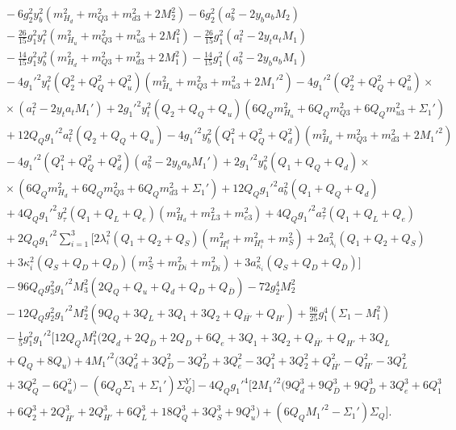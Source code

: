 \documentclass[preprint,amsmath,amssymb,aps,superscriptaddress,prd,showpacs,floatfix,nofootinbib]{revtex4-1}
\begin{document}
\begin{subequations}
\begin{align}
&{}-6g_2^2y_b^2\left ( m_{H_d}^2+m_{Q3}^2+m_{d3}^2+2M_2^2\right )-6g_2^2\left ( a_b^2-2y_ba_bM_2\right )\nonumber\\
&{}-\frac{26}{15}g_1^2y_t^2\left ( m_{H_u}^2+m_{Q3}^2+m_{u3}^2+2M_1^2\right )-\frac{26}{15}g_1^2\left ( a_t^2-2y_ta_tM_1\right )\nonumber\\
&{}-\frac{14}{15}g_1^2y_b^2\left ( m_{H_d}^2+m_{Q3}^2+m_{d3}^2+2M_1^2\right )-\frac{14}{15}g_1^2\left ( a_b^2-2y_ba_bM_1\right )\nonumber\\
&{}-4g_1'^2y_t^2\left ( Q_2^2+Q_Q^2+Q_u^2\right )\left ( m_{H_u}^2+m_{Q3}^2+m_{u3}^2+2M_1'^2\right )-4g_1'^2\left ( Q_2^2+Q_Q^2+Q_u^2\right )\times\nonumber\\
&{}\times\left ( a_t^2-2y_ta_tM_1'\right )+2g_1'^2y_t^2\left ( Q_2+Q_Q+Q_u\right )\left ( 6Q_Qm_{H_u}^2+6Q_Qm_{Q3}^2+6Q_Qm_{u3}^2+\Sigma_1'\right )\nonumber\\
&{}+12Q_Qg_1'^2a_t^2\left ( Q_2+Q_Q+Q_u\right )-4g_1'^2y_b^2\left ( Q_1^2+Q_Q^2+Q_d^2\right )\left ( m_{H_d}^2+m_{Q3}^2+m_{d3}^2+2M_1'^2\right )\nonumber\\
&{}-4g_1'^2\left ( Q_1^2+Q_Q^2+Q_d^2\right )\left ( a_b^2-2y_ba_bM_1'\right )+2g_1'^2y_b^2\left ( Q_1+Q_Q+Q_d\right )\times\nonumber\\
&{}\times\left ( 6Q_Qm_{H_d}^2+6Q_Qm_{Q3}^2+6Q_Qm_{d3}^2+\Sigma_1'\right )+12Q_Qg_1'^2a_b^2\left ( Q_1+Q_Q+Q_d\right )\nonumber\\
&{}+4Q_Qg_1'^2y_\tau^2\left (Q_1+Q_L+Q_e\right )\left ( m_{H_d}^2+m_{L3}^2+m_{e3}^2\right )+4Q_Qg_1'^2a_\tau^2\left ( Q_1+Q_L+Q_e\right )\nonumber\\
&{}+2Q_Qg_1'^2\sum_{i=1}^3\Big [ 2\lambda_i^2\left ( Q_1+Q_2+Q_S\right )\left ( m_{H_i^d}^2+m_{H_i^u}^2+m_S^2\right )+2a_{\lambda_i}^2\left ( Q_1+Q_2+Q_S\right )\nonumber\\
&{}+3\kappa_i^2\left ( Q_S+Q_D+Q_{\overline{D}}\right )\left ( m_S^2+m_{Di}^2+m_{\overline{D}i}^2\right )+3a_{\kappa_i}^2\left ( Q_S+Q_D+Q_{\overline{D}}\right )\Big ]\nonumber\\
&{}-96Q_Qg_3^2g_1'^2M_3^2\left ( 2Q_Q+Q_u+Q_d+Q_D+Q_{\overline{D}}\right )-72g_2^4M_2^2\nonumber\\
&{}-12Q_Qg_2^2g_1'^2M_2^2\left ( 9Q_Q+3Q_L+3Q_1+3Q_2+Q_{\overline{H'}}+Q_{H'}\right )+\frac{96}{25}g_1^4\left ( \Sigma_1-M_1^2\right )\nonumber\\
&{}-\frac{1}{5}g_1^2g_1'^2\big [ 12Q_QM_1^2\big ( 2Q_d+2Q_{\overline{D}}+2Q_D+6Q_e+3Q_1+3Q_2+Q_{\overline{H'}}+Q_{H'}+3Q_L\nonumber\\
&{}+Q_Q+8Q_u\big )+4M_1'^2\big ( 3Q_d^2+3Q_{\overline{D}}^2-3Q_D^2+3Q_e^2-3Q_1^2+3Q_2^2+Q_{\overline{H'}}^2-Q_{H'}^2-3Q_L^2\nonumber\\
&{}+3Q_Q^2-6Q_u^2\big )-\left ( 6Q_Q\Sigma_1+\Sigma_1'\right )\Sigma_Q^Y\big ]-4Q_Qg_1'^4\big [ 2M_1'^2\big ( 9Q_d^3+9Q_{\overline{D}}^3+9Q_D^3+3Q_e^3+6Q_1^3\nonumber\\
&{}+6Q_2^3+2Q_{\overline{H'}}^3+2Q_{H'}^3+6Q_L^3+18Q_Q^3+3Q_S^3+9Q_u^3\big )+\left ( 6Q_QM_1'^2-\Sigma_1'\right )\Sigma_Q\big ].\label{eq:USSMmq222Ot2Coeff}
\end{align}
\end{subequations}
\end{document}

